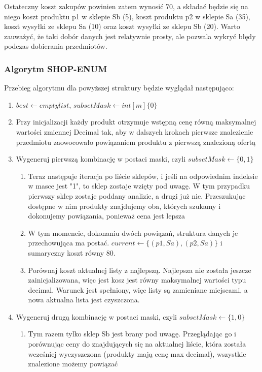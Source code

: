 \documentclass[a4paper]{article}
\begin{document}
Ostateczny koszt zakupów powinien zatem wynosić 70, a składać będzie się na niego koszt produktu p1 w sklepie Sb (5), koszt produktu p2 w sklepie Sa (35), koszt wysyłki ze sklepu Sa (10) oraz koszt wysyłki ze sklepu Sb (20). Warto zauważyć, że taki dobór danych jest relatywnie prosty, ale pozwala wykryć błędy podczas dobierania przedmiotów.

\subsubsection{Algorytm SHOP-ENUM}
Przebieg algorytmu dla powyższej struktury będzie wyglądał następująco:
\begin{enumerate}
\item {$best \leftarrow empty list$, $subsetMask \leftarrow int[m]\{0\}$}
\item{ Przy inicjalizacji każdy produkt otrzymuje wstępną cenę równą maksymalnej wartości zmiennej Decimal tak, aby w dalszych krokach pierwsze znalezienie przedmiotu zaowocowało powiązaniem produktu z pierwszą znalezioną ofertą}
\item {Wygeneruj pierwszą kombinację w postaci maski, czyli $subsetMask \leftarrow \{0, 1\}$
\begin{enumerate}
\item {Teraz następuje iteracja po liście sklepów, i jeśli na odpowiednim indeksie w masce jest "1", to sklep zostaje wzięty pod uwagę. W tym przypadku pierwszy sklep zostaje poddany analizie, a drugi już nie. Przeszukując dostępne w nim produkty znajdujemy oba, których szukamy i dokonujemy powiązania, ponieważ cena jest lepsza}
\item{W tym momencie, dokonaniu dwóch powiązań, struktura danych je przechowująca ma postać.
$current \leftarrow \{(p1, Sa), (p2, Sa)\}$ i sumaryczny koszt równy 80.}
\item {Porównaj koszt aktualnej listy z najlepszą. Najlepsza nie została jeszcze zainicjalizowana, więc jest kosz jest równy maksymalnej wartości typu decimal. Warunek jest spełniony, więc listy są zamieniane miejscami, a nowa aktualna lista jest czyszczona.}
\end{enumerate}}
\item {Wygeneruj drugą kombinację w postaci maski, czyli $subsetMask \leftarrow \{1, 0\}$
\begin{enumerate}
\item {Tym razem tylko sklep Sb jest brany pod uwagę. Przeglądając go i porównując ceny do znajdujących się na aktualnej liście, która została wcześniej wyczyszczona (produkty mają cenę max decimal), wszystkie znalezione możemy powiązać}

\end{enumerate}}
\end{enumerate}
\end{document}
